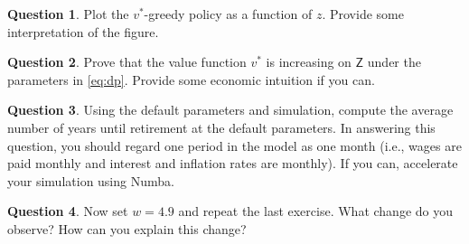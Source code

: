 \documentclass[12pt]{article}
\newcommand{\1}{\mathbbm 1}
\newcommand{\Zsf}{\mathsf Z}
\theoremstyle{definition}
\newtheorem{question}{Question}
\begin{document}
\begin{question}
    Plot the $v^*$-greedy policy as a function of $z$.
    Provide some interpretation of the figure.  
\end{question}

\begin{question}
    Prove that the value function $v^*$ is increasing on $\Zsf$ under the
    parameters in \eqref{eq:dp}.  Provide some economic intuition if you can.
\end{question}

\begin{question}
    Using the default parameters and simulation, compute the average number of
    years until retirement at the default parameters.  In answering this
    question, you should regard one period in the model as one month (i.e.,
    wages are paid monthly and interest and inflation rates are monthly).
    If you can, accelerate your simulation using Numba.
\end{question}

\begin{question}
    Now set $w=4.9$ and repeat the last exercise.  What change do you observe?
    How can you explain this change?
\end{question}
\end{document}
